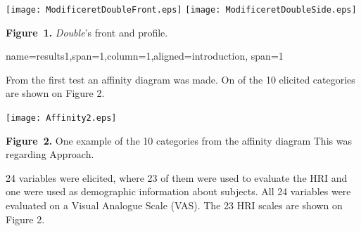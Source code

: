 \documentclass[paperwidth=118cm,paperheight=84cm,landscape,fontscale=0.2941]{baposter}
\begin{document}
\begin{poster}
{\begin{center}
\texttt{[image: ModificeretDoubleFront.eps]}
\texttt{[image: ModificeretDoubleSide.eps]}

\textbf{Figure~1. }\footnotesize{\textit{Double}'s front and profile.}
\end{center}
\vspace{-15pt}  



}


{name=results1,span=1,column=1,aligned=introduction, span=1}
{\parskip 5pt 
From the first test an affinity diagram was made. On of the 10 elicited categories are shown on Figure 2.
\vspace{-10pt}  
\begin{center}
	\texttt{[image: Affinity2.eps]}
	
	\textbf{Figure~2. }\footnotesize{One example of the 10 categories from the affinity diagram This was regarding Approach.}
\end{center}
\vspace{-10pt}  
24 variables were elicited, where 23 of them were used to evaluate the HRI and one were used as demographic information about subjects. All 24 variables were evaluated on a Visual Analogue Scale (VAS). The 23 HRI scales are shown on Figure 2.
  
}
\end{poster}
\end{document}

